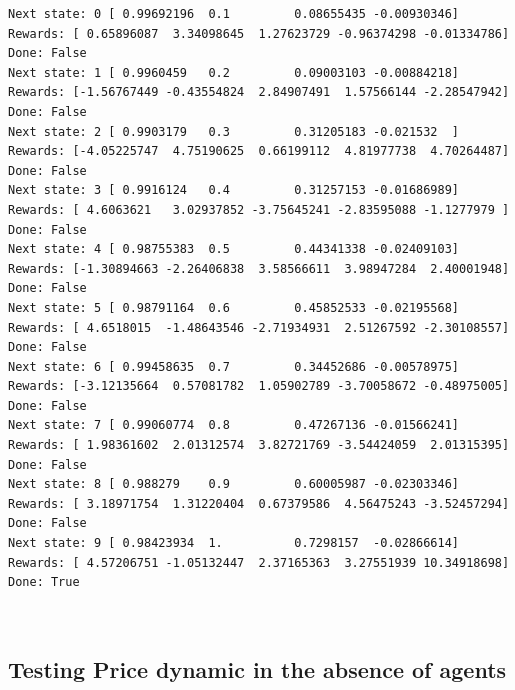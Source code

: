 \documentclass[11pt]{article}
\begin{document}
    \begin{Verbatim}[commandchars=\\\{\}]
Next state: 0 [ 0.99692196  0.1         0.08655435 -0.00930346]
Rewards: [ 0.65896087  3.34098645  1.27623729 -0.96374298 -0.01334786]
Done: False
Next state: 1 [ 0.9960459   0.2         0.09003103 -0.00884218]
Rewards: [-1.56767449 -0.43554824  2.84907491  1.57566144 -2.28547942]
Done: False
Next state: 2 [ 0.9903179   0.3         0.31205183 -0.021532  ]
Rewards: [-4.05225747  4.75190625  0.66199112  4.81977738  4.70264487]
Done: False
Next state: 3 [ 0.9916124   0.4         0.31257153 -0.01686989]
Rewards: [ 4.6063621   3.02937852 -3.75645241 -2.83595088 -1.1277979 ]
Done: False
Next state: 4 [ 0.98755383  0.5         0.44341338 -0.02409103]
Rewards: [-1.30894663 -2.26406838  3.58566611  3.98947284  2.40001948]
Done: False
Next state: 5 [ 0.98791164  0.6         0.45852533 -0.02195568]
Rewards: [ 4.6518015  -1.48643546 -2.71934931  2.51267592 -2.30108557]
Done: False
Next state: 6 [ 0.99458635  0.7         0.34452686 -0.00578975]
Rewards: [-3.12135664  0.57081782  1.05902789 -3.70058672 -0.48975005]
Done: False
Next state: 7 [ 0.99060774  0.8         0.47267136 -0.01566241]
Rewards: [ 1.98361602  2.01312574  3.82721769 -3.54424059  2.01315395]
Done: False
Next state: 8 [ 0.988279    0.9         0.60005987 -0.02303346]
Rewards: [ 3.18971754  1.31220404  0.67379586  4.56475243 -3.52457294]
Done: False
Next state: 9 [ 0.98423934  1.          0.7298157  -0.02866614]
Rewards: [ 4.57206751 -1.05132447  2.37165363  3.27551939 10.34918698]
Done: True
    \end{Verbatim}

    \begin{center}
    \end{center}
    { \hspace*{\fill} \\}
    
    \subsection{Testing Price dynamic in the absence of
agents}\label{testing-price-dynamic-in-the-absence-of-agents}
\end{document}
